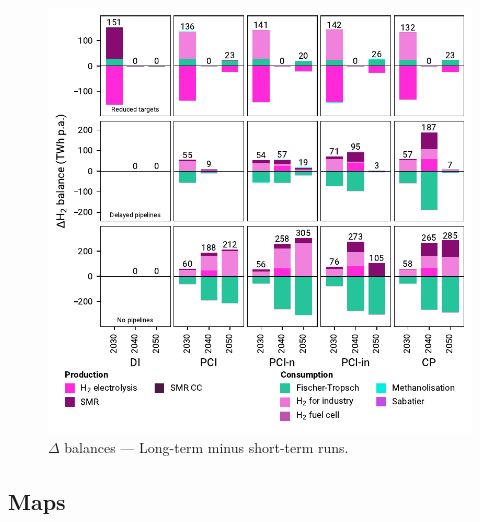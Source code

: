 \documentclass[preprint,12pt,sort&compress]{elsarticle}
\begin{document}
\begin{figure}[htbp]
  \centering
  \includegraphics[width=\textwidth]{balances_overview_extended_H2}
  \caption{$\Delta$ balances --- Long-term minus short-term runs.}
  \label{fig:balances_overview_extended_H2_stored}
\end{figure}

\clearpage
\subsection{Maps}
\end{document}
